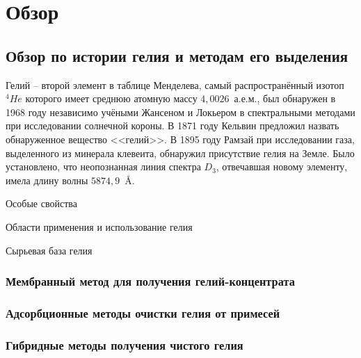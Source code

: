 \chapter{Обзор} \label{chapt_1}
\section{Обзор по истории гелия и методам его выделения} \label{section_1_1}

Гелий -- второй элемент в таблице Менделева, самый распространённый  изотоп $^4He$ которого имеет среднюю атомную массу  $4,0026$~а.е.м., был обнаружен в 1968 году независимо учёными Жансеном и Локьером в спектральными методами при исследовании солнечной короны. В 1871 году Кельвин предложил назвать обнаруженное вещество <<гелий>>.
В 1895 году Рамзай при исследовании газа, выделенного из минерала клевеита, обнаружил присутствие гелия на Земле. Было установлено, что неопознанная линия спектра $D_3$, отвечавшая новому элементу, имела длину волны $5874,9$~\AA \cite{Fastovskii}.

Особые свойства \cite{Yakuceni_Helium}

Области применения и использование гелия  \cite{Yakuceni_Helium, Yakuceni_USA}

Сырьевая база гелия \cite{Yakuceni_Material_Base}


\subsection{Мембранный метод для получения гелий-концентрата} \label{section_1_1_1}

\subsection{Адсорбционные методы очистки гелия от примесей} \label{section_1_1_2}

\subsection{Гибридные методы получения чистого гелия} \label{section_1_1_3}